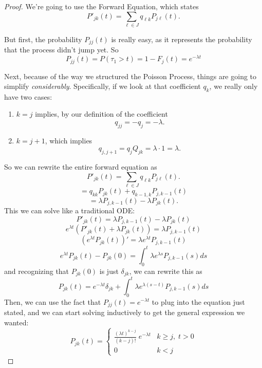 \documentclass[a4paper,11pt]{scrartcl}
\begin{document}
\begin{proof}
We're going to use the Forward Equation, which states
   \[P'_{jk}(t) = \sum_{\ell \in J} q_{\ell k} P_{j\ell}(t). \]

But first, the probability $P_{jj}(t)$ is really easy, as it represents
the probability that the process didn't jump yet. So
   \[ P_{jj}(t) = P(\tau_1 > t) = 1 - F_j(t) = e^{-\lambda t} \]


Next, because of the way we structured the Poisson Process, 
things are going
to simplify \emph{considerably}. Specifically, if we look at that
coefficient $q_{ k}$, we really only have two cases:
   \begin{enumerate}
      \item{$k = j$ implies, by our definition of the coefficient
	 \[ q_{jj} = - q_j = -\lambda.\] }
      \item{$k = j +1 $, which implies
	 \[ q_{j,j+1} = q_j Q_{jk} = \lambda \cdot 1 = \lambda.\] }
   \end{enumerate}
So we can rewrite the entire forward equation as 
   \[ P'_{jk}(t) = \sum_{\ell \in J} q_{\ell k} P_{j\ell}(t). \]
   \[ = q_{kk} P_{jk}(t) + q_{k-1,k} P_{j,k-1}(t) \]
   \[ =\lambda P_{j,k-1}(t) - \lambda P_{jk}(t) .\]
This we can solve like a traditional ODE:
   \[ P'_{jk}(t) = \lambda P_{j,k-1}(t) - \lambda P_{jk}(t) \]
   \[ e^{\lambda t} \left( P'_{jk}(t) + \lambda P_{jk}(t)\right) = 
       \lambda P_{j,k-1}(t) \]
   \[ \left(e^{\lambda t}  P_{jk}(t) \right)' = \lambda e^{\lambda t} 
      P_{j,k-1}(t) \]
   \[ e^{\lambda t}P_{jk}(t)-P_{jk}(0) = \int^t_0 \lambda e^{\lambda s} 
      P_{j,k-1}(s) ds \]
and recognizing that $P_{jk}(0)$ is just $\delta_{jk}$, we can
rewrite this as
   \[P_{jk}(t)=e^{-\lambda t}\delta_{jk} +  \int^t_0 
      \lambda e^{\lambda (s-t)} P_{j,k-1}(s) ds \]
Then, we can use the fact that $P_{jj}(t) = e^{-\lambda t}$ to plug into
the equation just stated, and we can start solving inductively to get
the general expression we wanted:
   \[ P_{jk}(t) = \begin{cases} \frac{(\lambda t)^{k-j}}{(k-j)!} \;
      e^{-\lambda t} & k \geq j, \; t > 0 \\ 0 & k < j \end{cases} \]
\end{proof}
\end{document}
